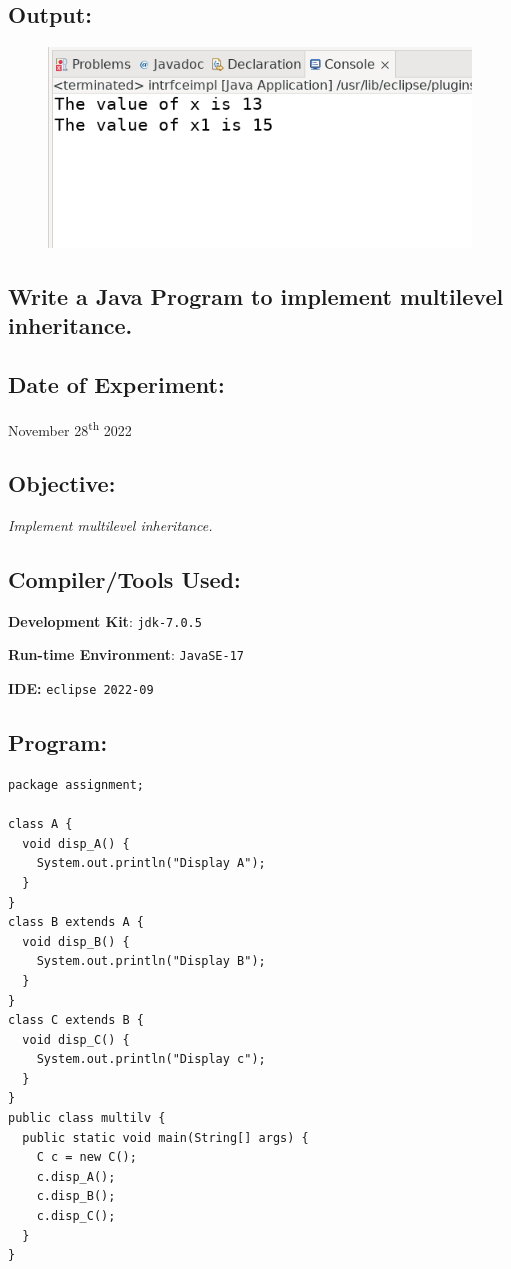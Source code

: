 \documentclass[12pt, a4paper]{article}
\begin{document}
\subsection*{Output:}
\begin{figure}[h]
  \centering
  \includegraphics[width=\textwidth]{intrfceimpl}
\end{figure}
\newpage

\begin{tcolorbox}
\section{Write a Java Program to implement multilevel inheritance.}
\end{tcolorbox}


\subsection*{Date of Experiment:}
November 28\textsuperscript{th} 2022

\subsection*{Objective:}
\emph{\large{Implement multilevel inheritance.}}

\subsection*{Compiler/Tools Used:}
\textbf{Development Kit}: \verb+jdk-7.0.5+

\textbf{Run-time Environment}: \verb+JavaSE-17+

\textbf{IDE:} \verb+eclipse 2022-09+

\subsection*{Program:}
\begin{lstlisting}
package assignment;

class A {
  void disp_A() {
    System.out.println("Display A");
  }
}
class B extends A {
  void disp_B() {
    System.out.println("Display B");
  }
}
class C extends B {
  void disp_C() {
    System.out.println("Display c");
  }
}
public class multilv {
  public static void main(String[] args) {
    C c = new C();
    c.disp_A();
    c.disp_B();
    c.disp_C();
  }
}
\end{lstlisting}
\end{document}
